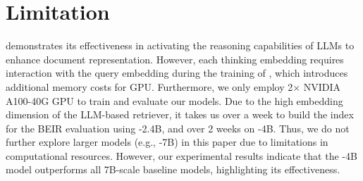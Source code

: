\section*{Limitation}
\method{} demonstrates its effectiveness in activating the reasoning capabilities of LLMs to enhance document representation. 
However, each thinking embedding requires interaction with the query embedding during the training of \method{}, which introduces additional memory costs for GPU. 
Furthermore, we only employ 2$\times$ NVIDIA A100-40G GPU to train and evaluate our \method{} models. Due to the high embedding dimension of the LLM-based retriever, it takes us over a week to build the index for the BEIR evaluation using \method{}-2.4B, and over 2 weeks on \method{}-4B. 
Thus, we do not further explore larger \method{} models (e.g., \method{}-7B) in this paper due to limitations in computational resources.  
However, our experimental results indicate that the \method{}-4B model outperforms all 7B-scale baseline models, highlighting its effectiveness.